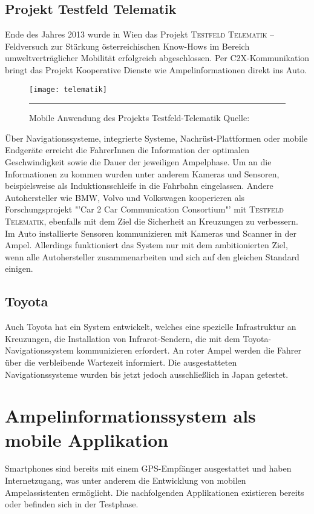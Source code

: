 \subsection*{Projekt Testfeld Telematik}
Ende des Jahres 2013 wurde in Wien das Projekt \textsc{Testfeld Telematik} -- Feldversuch zur Stärkung österreichischen Know-Hows im Bereich umweltverträglicher Mobilität erfolgreich abgeschlossen. Per \gls{C2X}-Kommunikation bringt das Projekt Kooperative Dienste wie Ampelinformationen direkt ins Auto. 
\begin{figure}[H]
    \centering
    \texttt{[image: telematik]} 
    \rule{35em}{0.5pt}
    \label{fig:telematik}
    \caption[Projekt Testfeld-Telematik Ampelinformation]{Mobile Anwendung des Projekts Testfeld-Telematik Quelle: \cite{Telematik}}
\end{figure} 
Über Navigationssysteme, integrierte Systeme, Nachrüst-Plattformen oder mobile Endgeräte erreicht die FahrerInnen die Information der optimalen Geschwindigkeit sowie die Dauer der jeweiligen Ampelphase\cite{Telematik}. Um an die Informationen zu kommen wurden unter anderem Kameras und Sensoren, beispielsweise als Induktionsschleife in die Fahrbahn eingelassen. Andere Autohersteller wie BMW, Volvo und Volkswagen kooperieren als Forschungsprojekt "'Car 2 Car Communication Consortium"' mit \textsc{Testfeld Telematik}, ebenfalls mit dem Ziel die Sicherheit an Kreuzungen zu verbessern. Im Auto installierte Sensoren kommunizieren mit Kameras und Scanner in der Ampel. Allerdings funktioniert das System nur mit dem ambitionierten Ziel, wenn alle Autohersteller zusammenarbeiten und sich auf den gleichen Standard einigen. \cite{Siemens}
\subsection*{Toyota}
Auch Toyota hat ein System entwickelt, welches eine spezielle Infrastruktur an Kreuzungen, die Installation von Infrarot-Sendern, die mit dem Toyota-Navigationssystem kommunizieren erfordert. An roter Ampel werden die Fahrer über die verbleibende Wartezeit informiert. Die ausgestatteten Navigationssysteme wurden bis jetzt jedoch ausschließlich in Japan getestet. \cite{Toyota}
%
%
\clearpage
\section{Ampelinformationssystem als mobile Applikation}
\glspl{Smartphone} sind bereits mit einem \gls{GPS}-Empfänger ausgestattet und haben Internetzugang, was unter anderem die Entwicklung von mobilen Ampelassistenten ermöglicht. Die nachfolgenden Applikationen existieren bereits oder befinden sich in der Testphase.
